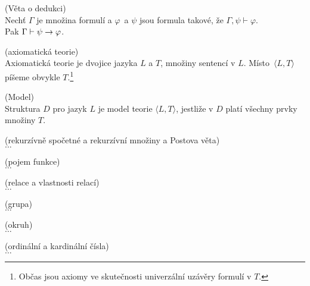 \begin{theorem}{(Věta o dedukci)}\\
Nechť $\Gamma$ je množina formulí a $\varphi$ a $\psi$ jsou formula takové, že $\Gamma, \psi \vdash \varphi$.\\ Pak $\Gamma \vdash \psi \rightarrow \varphi$.
\end{theorem}

\begin{definition}{(axiomatická teorie)}\\
Axiomatická teorie je dvojice jazyka $L$ a $T$, množiny sentencí v $L$. Místo $\langle L, T \rangle$ píšeme obvykle $T$.\footnote{Občas jsou axiomy ve skutečnosti univerzální uzávěry formulí v $T$.}
\end{definition}

\begin{definition}{(Model)}\\
Struktura $D$ pro jazyk $L$ je model teorie $\langle L,T \rangle$, jestliže v $D$ platí všechny prvky množiny $T$.
\end{definition}

\begin{definition}{(rekurzívně spočetné a rekurzívní množiny a Postova věta)}\\
$\ldots$
\end{definition}

\begin{definition}{(pojem funkce)}\\
$\ldots$
\end{definition}

\begin{definition}{(relace a vlastnosti relací)}\\
$\ldots$
\end{definition}

\begin{definition}{(grupa)}\\
$\ldots$
\end{definition}

\begin{definition}{(okruh)}\\
$\ldots$
\end{definition}

\begin{definition}{(ordinální a kardinální čísla)}\\
$\ldots$
\end{definition}

